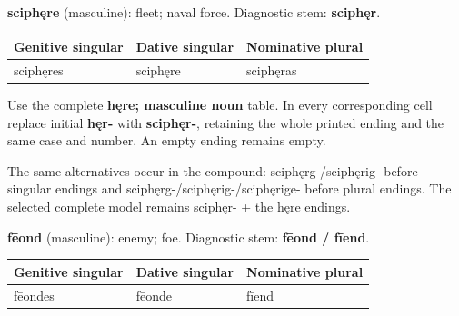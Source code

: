 \textbf{sciphęre} (masculine): fleet; naval force. Diagnostic stem: \textbf{sciphęr}.

\par\begingroup
\fontsize{10.5}{13.2}\selectfont
\setlength{\LTleft}{0pt}\setlength{\LTright}{\fill}
\noindent
\begin{tabular}{@{}>{\raggedright\arraybackslash}p{40.42mm}>{\raggedright\arraybackslash}p{35.77mm}>{\raggedright\arraybackslash}p{42.19mm}@{}}
\toprule
\textbf{Genitive singular} & \textbf{Dative singular} & \textbf{Nominative plural} \\
\midrule
sciphęres & sciphęre & sciphęras \\
\bottomrule
\end{tabular}
\par\endgroup

Use the complete \textbf{hęre; masculine noun} table. In every corresponding cell replace initial \textbf{hęr-} with \textbf{sciphęr-}, retaining the whole printed ending and the same case and number. An empty ending remains empty.

The same alternatives occur in the compound: sciphęrg-/\allowbreak{}sciphęrig- before singular endings and sciphęrg-/\allowbreak{}sciphęrig-/\allowbreak{}sciphęrige- before plural endings. The selected complete model remains sciphęr- + the hęre endings.

\textbf{fēond} (masculine): enemy; foe. Diagnostic stem: \textbf{fēond /\allowbreak{} fīend}.

\par\begingroup
\fontsize{10.5}{13.2}\selectfont
\setlength{\LTleft}{0pt}\setlength{\LTright}{\fill}
\noindent
\begin{tabular}{@{}>{\raggedright\arraybackslash}p{39.24mm}>{\raggedright\arraybackslash}p{36.31mm}>{\raggedright\arraybackslash}p{42.82mm}@{}}
\toprule
\textbf{Genitive singular} & \textbf{Dative singular} & \textbf{Nominative plural} \\
\midrule
fēondes & fēonde & fīend \\
\bottomrule
\end{tabular}
\par\endgroup

